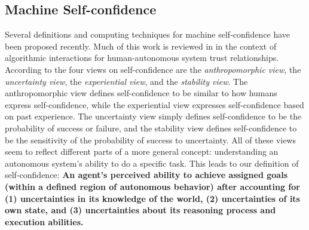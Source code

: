 \subsection{Machine Self-confidence}    

Several definitions and computing techniques for machine self-confidence have been proposed recently. Much of this work is reviewed in \cite{Israelsen2017-ym} in the context of algorithmic interactions for human-autonomous system trust relationships. %
According to \cite{Sweet2016-tz} the four views on self-confidence are the \textit{anthropomorphic view}, the \textit{uncertainty view}, the \textit{experiential view}, and the \textit{stability view}. The anthropomorphic view defines self-confidence to be similar to how humans express self-confidence, while the experiential view expresses self-confidence based on past experience. The uncertainty view simply defines self-confidence to be the probability of success or failure, and the stability view defines self-confidence to be the sensitivity of the probability of success to uncertainty. All of these views seem to reflect different parts of a more general concept: understanding an autonomous system's ability to do a specific task. 
This leads to our definition of self-confidence: \textbf{An agent's perceived ability to achieve assigned goals (within a defined region of autonomous behavior) after accounting for (1) uncertainties in its knowledge of the world, (2) uncertainties of its own state, and (3) uncertainties about its reasoning process and execution abilities.}

